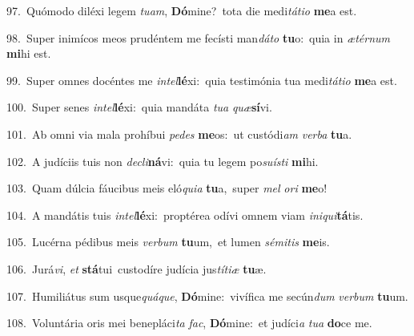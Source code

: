 {\numbfont\textcolor{\numbcolor}{97.}}~Quómodo diléxi legem \textit{tu}\-\textit{am}, \textbf{Dó}\-mine?~\star tota die medi\-\textit{tá}\-\textit{ti}\textit{o} \textbf{me}\-a est.\par
{\numbfont\textcolor{\numbcolor}{98.}}~Super inimícos meos prudéntem me fecísti man\-\textit{dá}\-\textit{to} \textbf{tu}\-o:~\star quia in \textit{æ}\-\textit{tér}\textit{num} \textbf{mi}\-hi est.\par
{\numbfont\textcolor{\numbcolor}{99.}}~Super omnes docéntes me \textit{in}\-\textit{tel}\textbf{lé}xi:~\star quia testimónia tua medi\-\textit{tá}\-\textit{ti}\textit{o} \textbf{me}\-a est.\par
{\numbfont\textcolor{\numbcolor}{100.}}~Super senes \textit{in}\-\textit{tel}\textbf{lé}xi:~\star quia mandáta \textit{tu}\-\textit{a} \textit{quæ}\-\textbf{sí}vi.\par
{\numbfont\textcolor{\numbcolor}{101.}}~Ab omni via mala prohíbui \textit{pe}\-\textit{des} \textbf{me}\-os:~\star ut custódi\textit{am} \textit{ver}\-\textit{ba} \textbf{tu}\-a.\par
{\numbfont\textcolor{\numbcolor}{102.}}~A judíciis tuis non \textit{de}\-\textit{cli}\textbf{ná}vi:~\star quia tu legem po\-\textit{su}\-\textit{ís}\textit{ti} \textbf{mi}\-hi.\par
{\numbfont\textcolor{\numbcolor}{103.}}~Quam dúlcia fáucibus meis eló\-\textit{qui}\-\textit{a} \textbf{tu}\-a,~\star super \textit{mel} \textit{o}\-\textit{ri} \textbf{me}\-o!\par
{\numbfont\textcolor{\numbcolor}{104.}}~A mandátis tuis \textit{in}\-\textit{tel}\textbf{lé}xi:~\star proptérea odívi omnem viam \textit{in}\-\textit{i}\textit{qui}\textbf{tá}tis.\par
{\numbfont\textcolor{\numbcolor}{105.}}~Lucérna pédibus meis \textit{ver}\-\textit{bum} \textbf{tu}\-um,~\star et lumen \textit{sé}\-\textit{mi}\textit{tis} \textbf{me}\-is.\par
{\numbfont\textcolor{\numbcolor}{106.}}~Jurá\-\textit{vi}\-, \textit{et} \textbf{stá}\-tui~\star custodíre judícia jus\-\textit{tí}\-\textit{ti}\textit{æ} \textbf{tu}\-æ.\par
{\numbfont\textcolor{\numbcolor}{107.}}~Humiliátus sum usque\-\textit{quá}\-\textit{que}, \textbf{Dó}\-mine:~\star vivífica me secún\textit{dum} \textit{ver}\-\textit{bum} \textbf{tu}\-um.\par
{\numbfont\textcolor{\numbcolor}{108.}}~Voluntária oris mei benepláci\textit{ta} \textit{fac}\-, \textbf{Dó}\-mine:~\star et judíci\textit{a} \textit{tu}\-\textit{a} \textbf{do}\-ce me.\par
